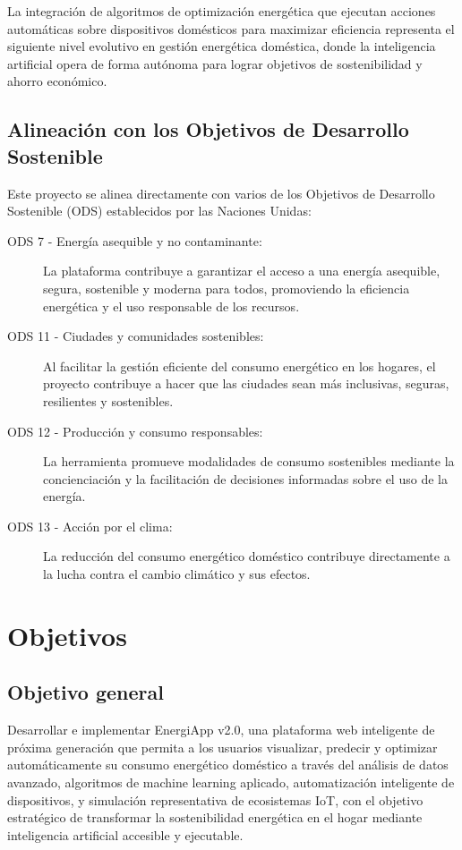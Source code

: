 La integración de algoritmos de optimización energética que ejecutan acciones automáticas sobre dispositivos domésticos para maximizar eficiencia representa el siguiente nivel evolutivo en gestión energética doméstica, donde la inteligencia artificial opera de forma autónoma para lograr objetivos de sostenibilidad y ahorro económico.

\subsection{Alineación con los Objetivos de Desarrollo Sostenible}

Este proyecto se alinea directamente con varios de los Objetivos de Desarrollo Sostenible (ODS) establecidos por las Naciones Unidas:

\begin{description}
    \item[ODS 7 - Energía asequible y no contaminante:] La plataforma contribuye a garantizar el acceso a una energía asequible, segura, sostenible y moderna para todos, promoviendo la eficiencia energética y el uso responsable de los recursos.
    
    \item[ODS 11 - Ciudades y comunidades sostenibles:] Al facilitar la gestión eficiente del consumo energético en los hogares, el proyecto contribuye a hacer que las ciudades sean más inclusivas, seguras, resilientes y sostenibles.
    
    \item[ODS 12 - Producción y consumo responsables:] La herramienta promueve modalidades de consumo sostenibles mediante la concienciación y la facilitación de decisiones informadas sobre el uso de la energía.
    
    \item[ODS 13 - Acción por el clima:] La reducción del consumo energético doméstico contribuye directamente a la lucha contra el cambio climático y sus efectos.
\end{description}

\section{Objetivos}

\subsection{Objetivo general}

Desarrollar e implementar EnergiApp v2.0, una plataforma web inteligente de próxima generación que permita a los usuarios visualizar, predecir y optimizar automáticamente su consumo energético doméstico a través del análisis de datos avanzado, algoritmos de machine learning aplicado, automatización inteligente de dispositivos, y simulación representativa de ecosistemas IoT, con el objetivo estratégico de transformar la sostenibilidad energética en el hogar mediante inteligencia artificial accesible y ejecutable.

